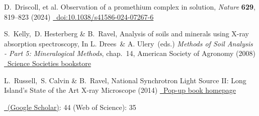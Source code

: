 \documentclass[11pt]{moderncv}
\begin{document}
%
{\small D.\ Driscoll, et al. Observation of a promethium complex in
  solution, \emph{Nature} \textbf{629}, 819–823 (2024)
  \href{https://doi.org/10.1038/s41586-024-07267-6}
  {\color{color2}\homepagesymbol~doi:10.1038/s41586-024-07267-6}}


%
{\small S.\ Kelly,\ D. Hesterberg \& B.\ Ravel, Analysis of soils and
  minerals using X-ray absorption spectroscopy, In L. Drees\ \&
  A. Ulery\ (eds.)  \emph{Methods of Soil Analysis - Part 5:
    Mineralogical Methods}, chap.~14, American Society of Agronomy
  (2008)
  \href{https://portal.sciencesocieties.org/Purchase/ProductDetail.aspx?Product_code=802f0511-76f0-dc11-b6b8-0013210e308c}
  {\color{color2}\homepagesymbol~Science Societies bookstore}}

%
{\small L.\ Russell,\ S. Calvin \& B.\ Ravel, National Synchrotron
  Light Source II: Long Island's State of the Art X-ray Microscope
  (2014)
  \href{http://bruceravel.github.io/synchrotron_pop_up_book/}
  {\color{color2}\homepagesymbol~Pop-up book homepage}}

%
{\small \href{http://scholar.google.com/citations?user=41rV5koAAAAJ}
  {\color{color2}\homepagesymbol~(Google Scholar)}: 44 \qquad
  (Web of Science): 35}

\nocite{*}


\end{document}
